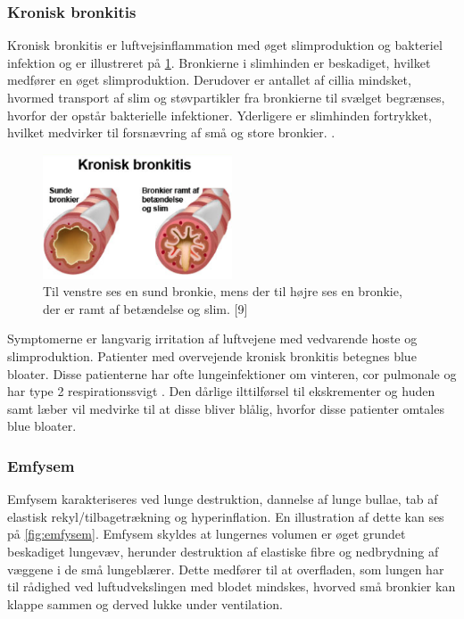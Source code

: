 \subsubsection{Kronisk bronkitis} 
Kronisk bronkitis er luftvejsinflammation med øget slimproduktion og bakteriel infektion og er illustreret på \ref{fig:kroniskbronkitis}. Bronkierne i slimhinden er beskadiget, hvilket medfører en øget slimproduktion. Derudover er antallet af cillia  mindsket, hvormed transport af slim og støvpartikler fra bronkierne til svælget begrænses, hvorfor der opstår bakterielle infektioner. Yderligere er slimhinden fortrykket, hvilket medvirker til forsnævring af små og store bronkier. \cite{Frausing2011, Britannica2016}. 

\begin{figure} [H]
\centering
\includegraphics[width=0.5\textwidth]{figures/kroniskbronkitis}
\caption{Til venstre ses en sund bronkie, mens der til højre ses en bronkie, der er ramt af betændelse og slim.  [9]}
\label{fig:kroniskbronkitis}
\end{figure} 

\noindent
Symptomerne er langvarig irritation af luftvejene med vedvarende hoste og slimproduktion. Patienter med overvejende kronisk bronkitis betegnes blue bloater. Disse patienterne har ofte lungeinfektioner om vinteren, cor pulmonale  og har type 2 respirationssvigt . Den dårlige ilttilførsel til ekskrementer og huden samt læber vil medvirke til at disse bliver blålig, hvorfor disse patienter omtales blue bloater. \cite{Healthguidances2016}

\subsubsection{Emfysem}
Emfysem karakteriseres ved lunge destruktion, dannelse af lunge bullae, tab af elastisk rekyl/tilbagetrækning og hyperinflation. En illustration af dette kan ses på \ref{fig:emfysem}. Emfysem skyldes at lungernes volumen er øget grundet beskadiget lungevæv, herunder destruktion af elastiske fibre og nedbrydning af væggene i de små lungeblærer. Dette medfører til at overfladen, som lungen har til rådighed ved luftudvekslingen med blodet mindskes, hvorved små bronkier kan klappe sammen og derved lukke under ventilation.\cite{Frausing2011a, Flaschen-Hansen2008}

